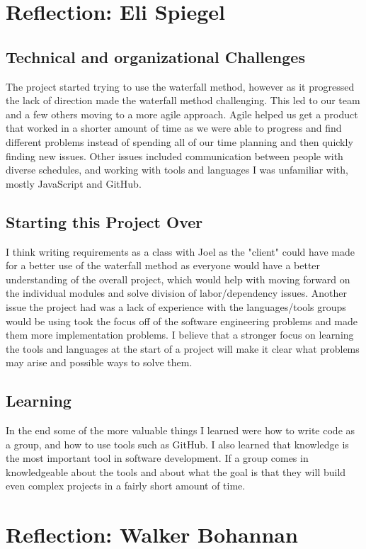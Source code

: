 \documentclass[a4paper]{article}
\begin{document}
\section{Reflection: Eli Spiegel}
\subsection{Technical and organizational Challenges}
The project started trying to use the waterfall method, however as it progressed the lack of direction made the waterfall method challenging. This led to our team and a few others moving to a more agile approach. Agile helped us get a product that worked in a shorter amount of time as we were able to progress and find different problems instead of spending all of our time planning and then quickly finding new issues. Other issues included communication between people with diverse schedules, and working with tools and languages I was unfamiliar with, mostly JavaScript and GitHub.

\subsection{Starting this Project Over}
I think writing requirements as a class with Joel as the "client" could have made for a better use of the waterfall method as everyone would have a better understanding of the overall project, which would help with moving forward on the individual modules and solve division of labor/dependency issues. Another issue the project had was a lack of experience with the languages/tools groups would be using took the focus off of the software engineering problems and made them more implementation problems. I believe that a stronger focus on learning the tools and languages at the start of a project will make it clear what problems may arise and possible ways to solve them. 

\subsection{Learning}
In the end some of the more valuable things I learned were how to write code as a group, and how to use tools such as GitHub. I also learned that knowledge is the most important tool in software development.  If a group comes in knowledgeable about the tools and about what the goal is that they will build even complex projects in a fairly short amount of time.

\section{Reflection: Walker Bohannan}
\end{document}

